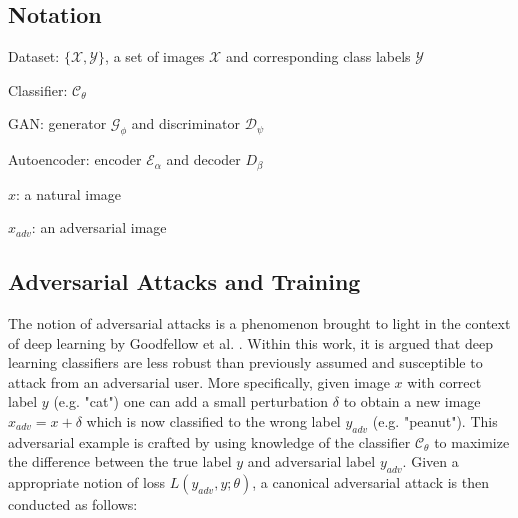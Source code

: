 \documentclass[twoside]{article}
\theoremstyle{definition}
\begin{document}
\subsection{Notation}

Dataset: $\{\mathcal{X},\mathcal{Y}\}$, a set of images $\mathcal{X}$ and corresponding
class labels $\mathcal{Y}$


Classifier: $\mathcal{C}_{\theta}$ 

GAN: generator $\mathcal{G}_{\phi}$ and discriminator $\mathcal{D}_{\psi}$

Autoencoder: encoder $\mathcal{E}_{\alpha}$ and decoder $D_\beta$

$x$: a natural image

$x_{adv}$: an adversarial image

\subsection{Adversarial Attacks and Training}
The notion of adversarial attacks is a phenomenon brought to light in the context of deep learning by Goodfellow et al. \cite{2014arXiv1412.6572G}. Within this work, it is argued that deep learning classifiers are less robust than previously assumed and susceptible to attack from an adversarial user. More specifically, given image $x$ with correct label $y$ (e.g. "cat") one can add a small perturbation $\delta$ to obtain a new image $x_{adv} = x + \delta$ which is now classified to the wrong label $y_{adv}$ (e.g. "peanut"). This adversarial example is crafted by using knowledge of the classifier $\mathcal{C_{\theta}}$ to maximize the difference between the true label $y$ and adversarial label $y_{adv}$. Given a appropriate notion of loss $L(y_{adv},y;\theta)$, a canonical adversarial attack is then conducted as follows:
\end{document}
